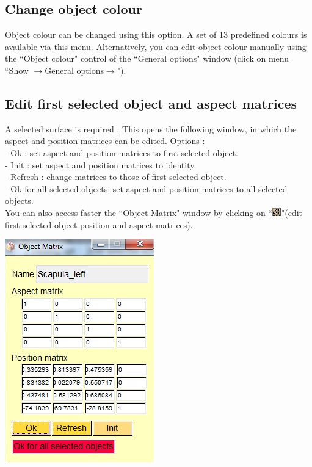 \subsection{Change object colour}
Object colour can be changed using this option. A set of 13 predefined colours is available via this menu. Alternatively, you can edit object colour manually using the ``Object colour" control of the ``General options" window (click on menu ``Show $\rightarrow$General options$\rightarrow$").

\subsection{Edit first selected object and aspect matrices}\label{edit_mat_section}

\noindent
\begin{minipage}{0.6\textwidth}

A selected surface is required . This opens the following window,
in which the aspect and position matrices can be edited.
Options :\\
- Ok : set aspect and position matrices to first selected object.\\
- Init : set aspect and position matrices to identity.\\
- Refresh : change matrices to those of first selected object.\\
- Ok for all selected objects: set aspect and position matrices to
all selected objects.\\
You can also access faster the ``Object Matrix" window by clicking
on ``\includegraphics[scale=0.7]{images/pixmap/mat.png}"(edit first selected object position and aspect matrices).

\end{minipage}    
\begin{minipage}{0.4\textwidth}\centering
  \includegraphics[scale=0.5]{images/File/Position2.png}
 \end{minipage} 
\noindent




